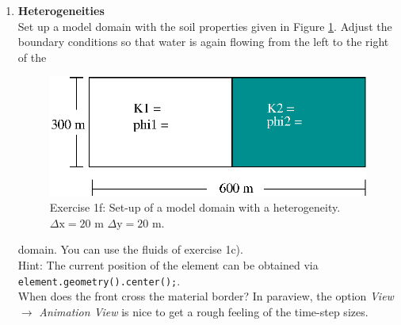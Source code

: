 \begin{enumerate}
\item \textbf{Heterogeneities}  \\
  Set up a model domain with the soil properties given in Figure
  \ref{tutorial-coupled:exercise1_d}. Adjust the boundary conditions
  so that water is again flowing from the left to the right of the
\begin{figure}[ht]
\centering
\includegraphics[width=0.5\linewidth,keepaspectratio]{EPS/exercise1_c.eps}
\caption{Exercise 1f: Set-up of a model domain with a heterogeneity. $\Delta \text{x} = 20$ m $\Delta \text{y} = 20$ m.}\label{tutorial-coupled:exercise1_d}
\end{figure}
domain. You can use the fluids of exercise 1c).\\
Hint: The current position of the element can be obtained via \texttt{element.geometry().center();}.\\
When does the front cross the material border? In paraview, the option \textit{View} $\rightarrow$ \textit{Animation View} is nice to get a rough feeling of the time-step sizes.
\end{enumerate}

